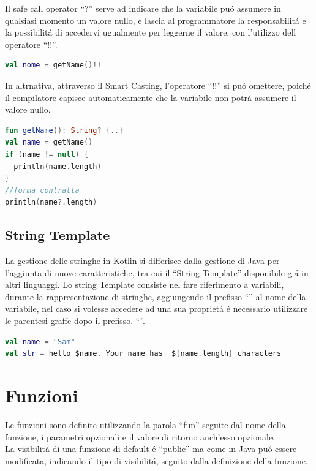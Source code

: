 Il safe call operator ``?'' serve ad indicare che la variabile pu\'o assumere in qualsiasi momento un valore nullo, e lascia al programmatore la responsabilit\'a e la possibilit\'a di accedervi ugualmente per leggerne il valore, con l'utilizzo dell operatore ``!!''.


\begin{lstlisting}[language=kotlin,caption={Esempio 2 Safe call operator Kotlin}]
val nome = getName()!!
\end{lstlisting}

In altrnativa, attraverso il Smart Casting, l'operatore ``!!'' si pu\'o omettere, poich\'e il compilatore capisce automaticamente che la variabile non potr\'a assumere il valore nullo.

\begin{lstlisting}[language=kotlin,caption={Smart Casting in Kotlin}]
fun getName(): String? {..}
val name = getName()
if (name != null) {
  println(name.length)
}
//forma contratta
println(name?.length)
\end{lstlisting}

\subsection{String Template}
La gestione delle stringhe in Kotlin si differisce dalla gestione di Java per l'aggiunta di nuove caratteristiche, tra cui il ``String Template'' disponibile gi\'a in altri linguaggi.
Lo string Template consiste nel fare riferimento a variabili, durante la rappresentazione di stringhe, aggiungendo il prefisso  ``\textdollar'' al nome della variabile, nel caso si volesse accedere ad una sua propriet\'a \'e necessario utilizzare le parentesi graffe dopo il prefisso. ``\textdollar''.


\begin{lstlisting}[language=kotlin,caption={Esempio String template Kotlin}]
val name = "Sam"
val str = hello $name. Your name has  ${name.length} characters
\end{lstlisting}


\section{Funzioni}
Le funzioni sono definite utilizzando la parola ``fun'' seguite dal nome della funzione, i parametri opzionali e il valore di ritorno anch'esso opzionale.\\
La visibilit\'a di una funzione di default \'e ``public'' ma come in Java pu\'o essere modificata, indicando il tipo di visibilit\'a, seguito dalla definizione della funzione.

